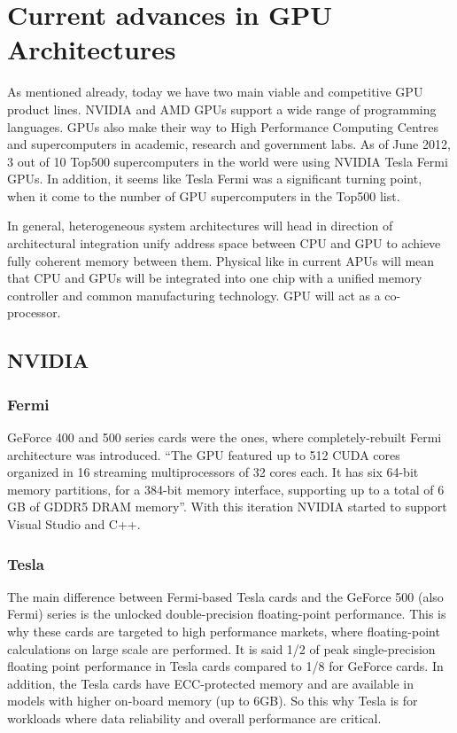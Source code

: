 \section{Current advances in GPU Architectures}
As mentioned already, today we have two main viable and competitive GPU product lines. NVIDIA and AMD GPUs support a wide range of programming languages. GPUs also make their way to High Performance Computing Centres and supercomputers in academic, research and government labs.\cite{nvidia2012super, nvidia2012super2} As of June 2012, 3 out of 10 Top500 supercomputers in the world were using NVIDIA Tesla Fermi GPUs.\cite{top5002012} In addition, it seems like Tesla Fermi was a significant turning point, when it come to the number of GPU supercomputers in the Top500 list.

In general, heterogeneous system architectures will head in direction of architectural integration unify address space between CPU and GPU to achieve fully coherent memory between them. Physical like in current APUs will mean that CPU and GPUs will be integrated into one chip with a unified memory controller and common manufacturing technology. \cite{amd2012hipeac} GPU will act as a co-processor.

\subsection{NVIDIA}

\subsubsection{Fermi}
GeForce 400 and 500 series cards were the ones, where completely-rebuilt Fermi architecture was introduced.\cite{nvidia2012fermiwhite} \enquote{The GPU featured up to 512 CUDA cores organized in 16 streaming multiprocessors of 32 cores each. It has six 64-bit memory partitions, for a 384-bit memory interface, supporting up to a total of 6 GB of GDDR5 DRAM memory}. With this iteration NVIDIA started to support Visual Studio and C++.

\subsubsection{Tesla}
The main difference between Fermi-based Tesla cards and the GeForce 500 (also Fermi) series is the unlocked double-precision floating-point performance. This is why these cards are targeted to high performance markets, where floating-point calculations on large scale are performed. It is said 1/2 of peak single-precision floating point performance in Tesla cards compared to 1/8 for GeForce cards. In addition, the Tesla cards have ECC-protected memory and are available in models with higher on-board memory (up to 6GB). So this why Tesla is for workloads where data reliability and overall performance are critical.

